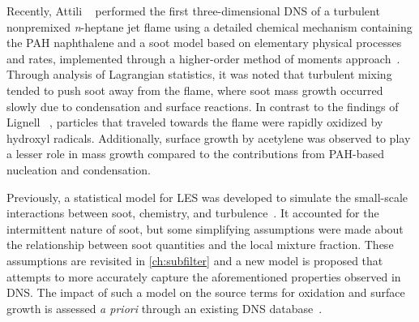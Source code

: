 Recently, Attili \etal~\cite{attili2014} performed the first three-dimensional DNS of a turbulent nonpremixed \textit{n}-heptane jet flame using a detailed chemical mechanism containing the PAH naphthalene and a soot model based on elementary physical processes and rates, implemented through a higher-order method of moments approach~\cite{hmom2009}. Through analysis of Lagrangian statistics, it was noted that turbulent mixing tended to push soot away from the flame, where soot mass growth occurred slowly due to condensation and surface reactions. In contrast to the findings of Lignell \etal~\cite{lignell2007,lignell2008}, particles that traveled towards the flame were rapidly oxidized by hydroxyl radicals. Additionally, surface growth by acetylene was observed to play a lesser role in mass growth compared to the contributions from PAH-based nucleation and condensation.

Previously, a statistical model for LES was developed to simulate the small-scale interactions between soot, chemistry, and turbulence~\cite{subfilterpdf2011}. It accounted for the intermittent nature of soot, but some simplifying assumptions were made about the relationship between soot quantities and the local mixture fraction. These assumptions are revisited in \cref{ch:subfilter} and a new model is proposed that attempts to more accurately capture the aforementioned properties observed in DNS. The impact of such a model on the source terms for oxidation and surface growth is assessed \textit{a priori} through an existing DNS database~\cite{attili2014}.





